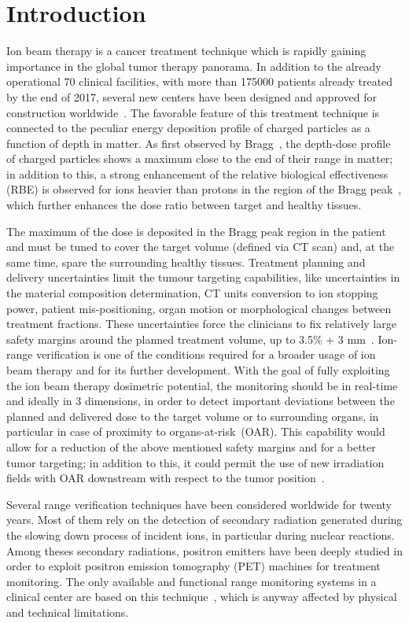 \section{Introduction}\label{section::Intro}
Ion beam therapy is a cancer treatment technique which is rapidly gaining importance in the global tumor therapy panorama. In addition to the already operational 70 clinical facilities, with more than 175000 patients already treated by the end of 2017, several new centers have been designed and approved for construction worldwide~\cite{PTCOG_stats}. The favorable feature of this treatment technique is connected to the peculiar energy deposition profile of charged particles as a function of depth in matter. As first observed by Bragg~\cite{Bragg_main}, the depth-dose profile of charged particles shows a maximum close to the end of their range in matter; in addition to this, a strong enhancement of the relative biological effectiveness (RBE) is observed for ions heavier than protons in the region of the Bragg peak~\cite{RBE_Elsasser, RBE_Weyrather}, which further enhances the 
dose ratio between target and healthy tissues.

The maximum of the dose is deposited in the Bragg peak region in the patient and must be tuned to cover the target volume (defined via CT scan) and, at the same time, spare the surrounding healthy tissues. Treatment planning and delivery uncertainties limit the tumour targeting capabilities, like uncertainties in the material composition determination, CT units conversion to ion stopping power, patient mis-positioning, organ motion or morphological changes between treatment fractions. These uncertainties force the clinicians to fix relatively large safety margins around the planned treatment volume, up to 3.5\% + 3 mm~\cite{Paganetti:2012aa}. Ion-range verification is one of the conditions required for a broader usage of ion beam therapy and for its further development. With the goal of fully exploiting the ion beam therapy dosimetric potential, the monitoring should be in real-time and ideally in 3 dimensions, in order to detect important deviations between the planned and delivered dose to the target volume or to surrounding organs, in particular in case of proximity to organs-at-risk~(OAR). This capability would allow for a reduction of the above mentioned safety margins and for a better tumor targeting; in addition to this, it could permit the use of new irradiation fields with OAR downstream with respect to the tumor position~\cite{Knopf:2013aa}.   

Several range verification techniques have been considered worldwide for twenty years. Most of them rely on the detection of secondary radiation generated during the slowing down process of incident ions, in particular during nuclear reactions. Among theses secondary radiations, positron emitters have been deeply studied in order to exploit positron emission tomography (PET) machines for treatment monitoring. The only available and functional range monitoring systems in a clinical center are based on this technique~\cite{ENGHARDT2004, Yamaya2018}, which is anyway affected by physical and technical limitations\cite{PARODI2016}.


